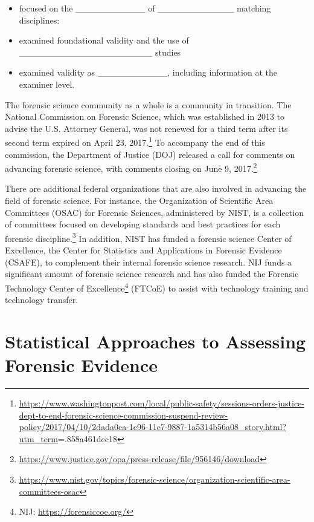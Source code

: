 \documentclass[]{book}
\providecommand{\tightlist}{%
  \setlength{\itemsep}{0pt}\setlength{\parskip}{0pt}}
\let\rmarkdownfootnote\footnote%
\def\footnote{\protect\rmarkdownfootnote}
\theoremstyle{definition}
\theoremstyle{definition}
\theoremstyle{remark}
\begin{document}
\begin{itemize}
\tightlist
\item
  focused on the \_\_\_\_\_\_\_\_\_\_\_ of \_\_\_\_\_\_\_\_\_\_\_\_
  matching disciplines: \vspace{.1in}
\item
  examined foundational validity and the use of
  \_\_\_\_\_\_\_\_\_\_\_\_\_\_\_\_\_\_\_\_\_ studies \vspace{.1in}
\item
  examined validity as \_\_\_\_\_\_\_\_\_\_\_, including information at
  the examiner level.
\end{itemize}

The forensic science community as a whole is a community in transition.
The National Commission on Forensic Science, which was established in
2013 to advise the U.S. Attorney General, was not renewed for a third
term after its second term expired on April 23, 2017.\footnote{\url{https://www.washingtonpost.com/local/public-safety/sessions-orders-justice-dept-to-end-forensic-science-commission-suspend-review-policy/2017/04/10/2dada0ca-1c96-11e7-9887-1a5314b56a08_story.html?utm_term}=.858a461dec18}
To accompany the end of this commission, the Department of Justice (DOJ)
released a call for comments on advancing forensic science, with
comments closing on June 9, 2017.\footnote{\url{https://www.justice.gov/opa/press-release/file/956146/download}}

There are additional federal organizations that are also involved in
advancing the field of forensic science. For instance, the Organization
of Scientific Area Committees (OSAC) for Forensic Sciences, administered
by NIST, is a collection of committees focused on developing standards
and best practices for each forensic discipline.\footnote{\url{https://www.nist.gov/topics/forensic-science/organization-scientific-area-committees-osac}}
In addition, NIST has funded a forensic science Center of Excellence,
the Center for Statistics and Applications in Forensic Evidence (CSAFE),
to complement their internal forensic science research. NIJ funds a
significant amount of forensic science research and has also funded the
Forensic Technology Center of Excellence\footnote{NIJ:
  \url{https://forensiccoe.org/}} (FTCoE) to assist with technology
training and technology transfer.

\section{Statistical Approaches to Assessing Forensic
Evidence}\label{statistical-approaches-to-assessing-forensic-evidence}
\end{document}
